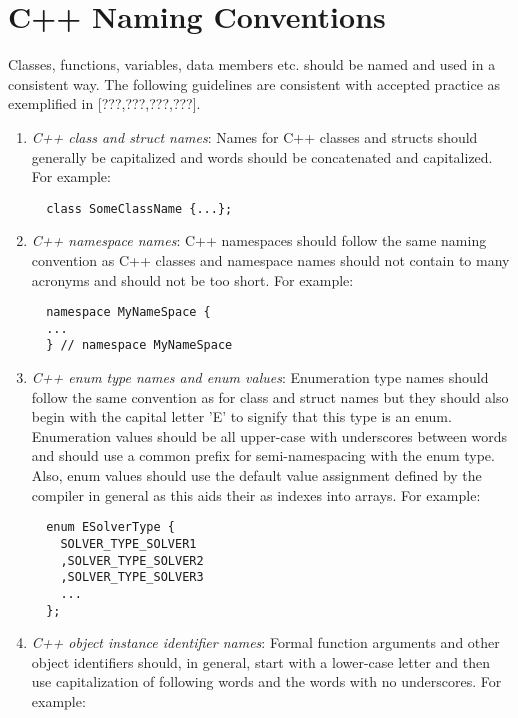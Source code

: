 
%
\section{C++ Naming Conventions}
%

Classes, functions, variables, data members etc. should be named and used in a
consistent way.  The following guidelines are consistent with accepted
practice as exemplified in [???,???,???,???].

\begin{enumerate}

{}\item\textit{C++ class and struct names}: Names for C++ classes and structs
should generally be capitalized and words should be concatenated and
capitalized.  For example:

{\small\begin{verbatim}
  class SomeClassName {...};
\end{verbatim}}

{}\item\textit{C++ namespace names}: C++ namespaces should follow the same
naming convention as C++ classes and namespace names should not contain to
many acronyms and should not be too short.  For example:

{\small\begin{verbatim}
  namespace MyNameSpace {
  ...
  } // namespace MyNameSpace 
\end{verbatim}}

{}\item\textit{C++ enum type names and enum values}: Enumeration type names
should follow the same convention as for class and struct names but they
should also begin with the capital letter 'E' to signify that this type is an
enum.  Enumeration values should be all upper-case with underscores between
words and should use a common prefix for semi-namespacing with the enum type.
Also, enum values should use the default value assignment defined by the
compiler in general as this aids their as indexes into arrays.  For example:

{\small\begin{verbatim}
  enum ESolverType {
    SOLVER_TYPE_SOLVER1
    ,SOLVER_TYPE_SOLVER2
    ,SOLVER_TYPE_SOLVER3
    ...
  };
\end{verbatim}}

{}\item\textit{C++ object instance identifier names}: Formal function
arguments and other object identifiers should, in general, start with a
lower-case letter and then use capitalization of following words and the
words with no underscores.  For example:


\end{enumerate}
